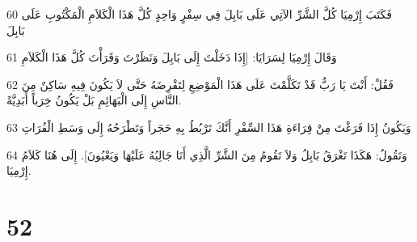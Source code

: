 \par 60 فَكَتَبَ إِرْمِيَا كُلَّ الشَّرِّ الآتِي عَلَى بَابِلَ فِي سِفْرٍ وَاحِدٍ كُلَّ هَذَا الْكَلاَمِ الْمَكْتُوبِ عَلَى بَابِلَ
\par 61 وَقَالَ إِرْمِيَا لِسَرَايَا: [إِذَا دَخَلْتَ إِلَى بَابِلَ وَنَظَرْتَ وَقَرَأْتَ كُلَّ هَذَا الْكَلاَمِ
\par 62 فَقُلْ: أَنْتَ يَا رَبُّ قَدْ تَكَلَّمْتَ عَلَى هَذَا الْمَوْضِعِ لِتَقْرِضَهُ حَتَّى لاَ يَكُونَ فِيهِ سَاكِنٌ مِنَ النَّاسِ إِلَى الْبَهَائِمِ بَلْ يَكُونُ خِرَباً أَبَدِيَّةً.
\par 63 وَيَكُونُ إِذَا فَرَغْتَ مِنْ قِرَاءَةِ هَذَا السِّفْرِ أَنَّكَ تَرْبُطُ بِهِ حَجَراً وَتَطْرَحُهُ إِلَى وَسَطِ الْفُرَاتِ
\par 64 وَتَقُولُ: هَكَذَا تَغْرَقُ بَابِلُ وَلاَ تَقُومُ مِنَ الشَّرِّ الَّذِي أَنَا جَالِبُهُ عَلَيْهَا وَيَعْيُونَ]. إِلَى هُنَا كَلاَمُ إِرْمِيَا.

\chapter{52}

